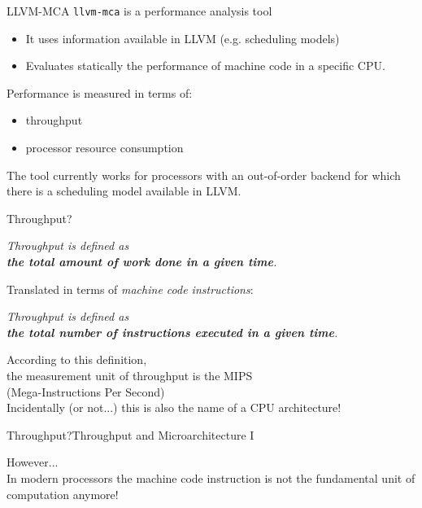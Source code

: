 \begin{frame}{LLVM-MCA}
\texttt{llvm-mca} is a \alert{performance analysis tool}\\
\begin{itemize}
\item It uses information available in LLVM (e.g. scheduling models)
\item Evaluates statically the performance of machine code in a specific CPU.
\end{itemize}

\bigskip
Performance is measured in terms of:\\
\begin{itemize}
\item throughput
\item processor resource consumption
\end{itemize}

\bigskip
The tool currently works for processors with an out-of-order backend for which there is a scheduling model available in LLVM.
\end{frame}


\begin{frame}{Throughput?}
\begin{center}
\emph{
Throughput is defined as\\\textbf{the total amount of work done in a given time}.\cite{hennessy2011computer}\\
}

\bigskip
Translated in terms of \emph{machine code instructions}:\\
\bigskip

\emph{
Throughput is defined as\\\textbf{the total number of instructions executed in a given time}.\\
}

\bigskip
According to this definition,\\the measurement unit of throughput is the \alert{MIPS}\\(Mega-Instructions Per Second)\\
\medskip
\footnotesize{Incidentally (or not...) this is also the name of a CPU architecture!}
\end{center}
\end{frame}


\begin{frame}{Throughput?}{Throughput and Microarchitecture I}
\begin{center}
{\LARGE However...}\\\Large
\bigskip
In modern processors the machine code instruction is not the fundamental unit of computation anymore!
\end{center}
\end{frame}


